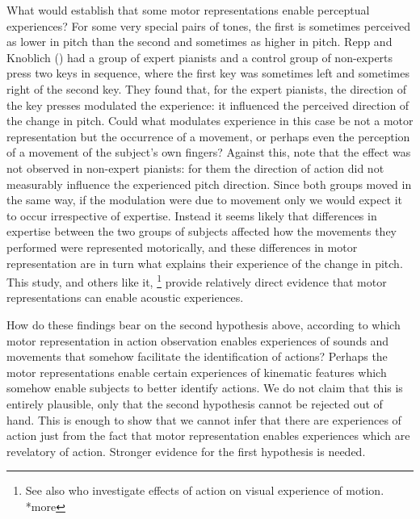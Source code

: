 \documentclass[12pt,\papersize]{extarticle}
\begin{document}
What would establish that some motor representations enable perceptual experiences? For some very special pairs of tones, the first is sometimes perceived as lower in pitch than the second and sometimes as higher in pitch.  Repp and Knoblich (\citeyear{repp:2007_action}) had a group of expert pianists and a control group of non-experts press two keys in sequence, where the first key was sometimes left and sometimes right of the second key.  They found that, for the expert pianists, the direction of the key presses modulated the experience: it influenced the perceived direction of the change in pitch. Could what modulates experience in this case be not a motor representation but the occurrence of a movement, or perhaps even the perception of a movement of the subject's own fingers?  Against this, note that the effect was not observed in non-expert pianists: for them the direction of action did not measurably influence the experienced pitch direction. Since both groups moved in the same way, if the modulation were due to movement only we would expect it to occur irrespective of expertise. Instead it seems likely that differences in expertise between the two groups of subjects affected how the movements they performed were represented motorically, and these differences in motor representation are in turn what explains their experience of the change in pitch.  This study, and others like it,%
\footnote{
See also \citet{zwickel:2010_interference} who investigate effects of action on visual experience of motion.  *more
} 
provide relatively direct evidence that motor representations can enable acoustic experiences.

How do these findings bear on the second hypothesis above, according to which motor representation in action observation enables experiences of sounds and movements that somehow facilitate the identification of actions?  Perhaps the motor representations enable certain experiences of kinematic features which somehow enable subjects to better identify actions.  We do not claim that this is entirely plausible, only that the second hypothesis cannot be rejected out of hand.  This is enough to show that we cannot infer that there are experiences of action just from the fact that motor representation enables experiences which are revelatory of action.  Stronger evidence for the first hypothesis is needed.
\end{document}
